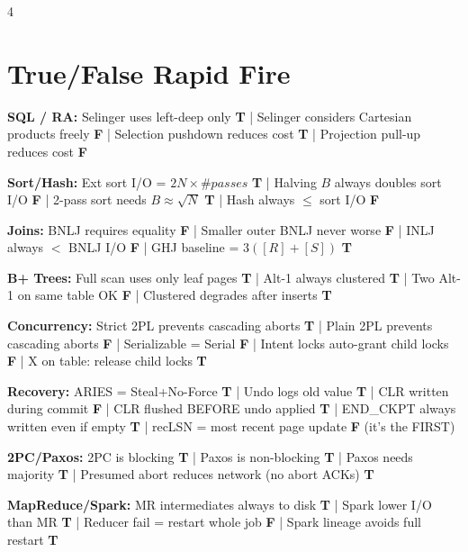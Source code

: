 \documentclass[8pt,letterpaper]{article}
\newcommand{\key}[1]{\textbf{\color{red!70!black}#1}}
\newcommand{\ans}[1]{\textbf{\color{blue!80!black}#1}}
\begin{document}
\begin{multicols*}{4}
\section{True/False Rapid Fire}
\key{SQL / RA:}
Selinger uses left-deep only \ans{T} |
Selinger considers Cartesian products freely \ans{F} |
Selection pushdown reduces cost \ans{T} |
Projection pull-up reduces cost \ans{F}

\key{Sort/Hash:}
Ext sort I/O = $2N\times\#passes$ \ans{T} |
Halving $B$ always doubles sort I/O \ans{F} |
2-pass sort needs $B\approx\sqrt{N}$ \ans{T} |
Hash always $\le$ sort I/O \ans{F}

\key{Joins:}
BNLJ requires equality \ans{F} |
Smaller outer BNLJ never worse \ans{F} |
INLJ always $<$ BNLJ I/O \ans{F} |
GHJ baseline = $3([R]+[S])$ \ans{T}

\key{B+ Trees:}
Full scan uses only leaf pages \ans{T} |
Alt-1 always clustered \ans{T} |
Two Alt-1 on same table OK \ans{F} |
Clustered degrades after inserts \ans{T}

\key{Concurrency:}
Strict 2PL prevents cascading aborts \ans{T} |
Plain 2PL prevents cascading aborts \ans{F} |
Serializable = Serial \ans{F} |
Intent locks auto-grant child locks \ans{F} |
X on table: release child locks \ans{T}

\key{Recovery:}
ARIES = Steal+No-Force \ans{T} |
Undo logs old value \ans{T} |
CLR written during commit \ans{F} |
CLR flushed BEFORE undo applied \ans{T} |
END\_CKPT always written even if empty \ans{T} |
recLSN = most recent page update \ans{F} (it's the FIRST)

\key{2PC/Paxos:}
2PC is blocking \ans{T} |
Paxos is non-blocking \ans{T} |
Paxos needs majority \ans{T} |
Presumed abort reduces network (no abort ACKs) \ans{T}

\key{MapReduce/Spark:}
MR intermediates always to disk \ans{T} |
Spark lower I/O than MR \ans{T} |
Reducer fail = restart whole job \ans{F} |
Spark lineage avoids full restart \ans{T}


\end{multicols*}
\end{document}
